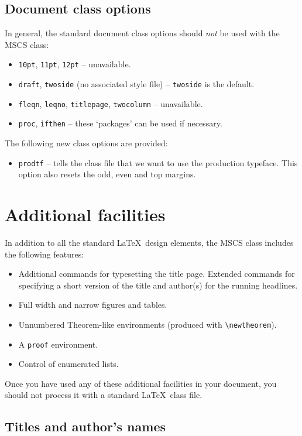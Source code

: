 \documentclass{mscs}
\begin{document}
\subsection{Document class options}

In general, the standard document class options should \emph{not} be
used with the MSCS class:
\begin{itemize}
  \item \texttt{10pt}, \texttt{11pt}, \texttt{12pt} -- unavailable.
  \item \texttt{draft}, \texttt{twoside} (no associated style file) --
        \texttt{twoside} is the default.
  \item \texttt{fleqn}, \texttt{leqno}, \texttt{titlepage}, \texttt{twocolumn} --
        unavailable.
  \item \texttt{proc}, \texttt{ifthen} -- these `packages' can be used if necessary.
\end{itemize}
%
\ifprodtf
The following new class options are provided:
\begin{itemize}
  \item \texttt{prodtf} -- tells the class file that we want to use the
    production typeface. This option also resets the odd, even and top
    margins.
\end{itemize}
\fi

\section{Additional facilities}

In addition to all the standard \LaTeX\ design elements, the MSCS class
includes the following features:
\begin{itemize}
  \item Additional commands for typesetting the title page. Extended
        commands for specifying a short version of the title and author(s)
        for the running headlines.
  \item Full width and narrow figures and tables.
  \item Unnumbered Theorem-like environments (produced with \verb"\newtheorem").
  \item A \verb"proof" environment.
  \item Control of enumerated lists.
\end{itemize}
Once you have used any of these additional facilities in your document,
you should not process it with a standard \LaTeX\ class file.

\subsection{Titles and author's names}
\end{document}
